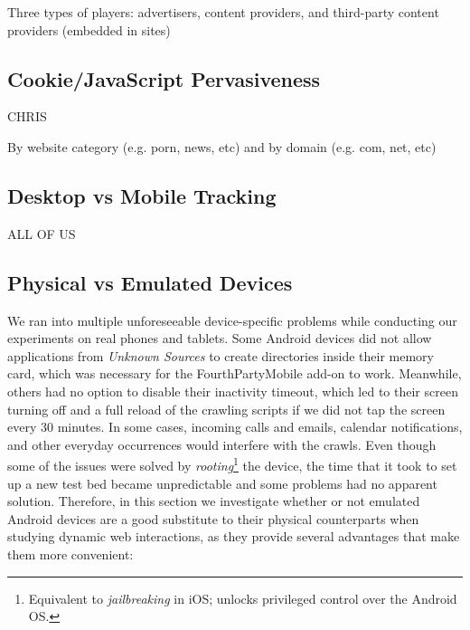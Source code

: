 \documentclass{acm_proc_article-sp}
\begin{document}
Three types of players: advertisers, content providers, and third-party content providers (embedded in sites)

\subsection{Cookie/JavaScript Pervasiveness}
CHRIS

By website category (e.g. porn, news, etc) and by domain (e.g. com, net, etc)

\subsection{Desktop vs Mobile Tracking}
ALL OF US

\subsection{Physical vs Emulated Devices}

We ran into multiple unforeseeable device-specific problems while conducting our experiments on real phones and tablets. Some Android devices did not allow applications from \emph{Unknown Sources} to create directories inside their memory card, which was necessary for the FourthPartyMobile add-on to work. Meanwhile, others had no option to disable their inactivity timeout, which led to their screen turning off and a full reload of the crawling scripts if we did not tap the screen every 30 minutes. In some cases, incoming calls and emails, calendar notifications, and other everyday occurrences would interfere with the crawls. Even though some of the issues were solved by \emph{rooting}\footnote{Equivalent to \emph{jailbreaking} in iOS; unlocks privileged control over the Android OS.} the device, the time that it took to set up a new test bed became unpredictable and some problems had no apparent solution. Therefore, in this section we investigate whether or not emulated Android devices are a good substitute to their physical counterparts when studying dynamic web interactions, as they provide several advantages that make them more convenient:
\end{document}
